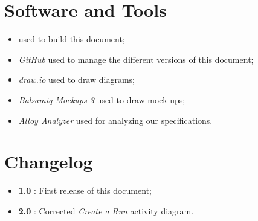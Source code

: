 \section{Software and Tools}
\begin{itemize}
  \item \text{\LaTeX} used to build this document;
  \item \textit{GitHub} used to manage the different versions of this document;
  \item \textit{draw.io} used to draw diagrams;
  \item \textit{Balsamiq Mockups 3} used to draw mock-ups;
  \item \textit{Alloy Analyzer} used for analyzing our specifications.
\end{itemize}


\section{Changelog}
\begin{itemize}
  \item \textbf{1.0} : First release of this document;
  \item \textbf{2.0} : Corrected \textit{Create a Run} activity diagram.
\end{itemize}
